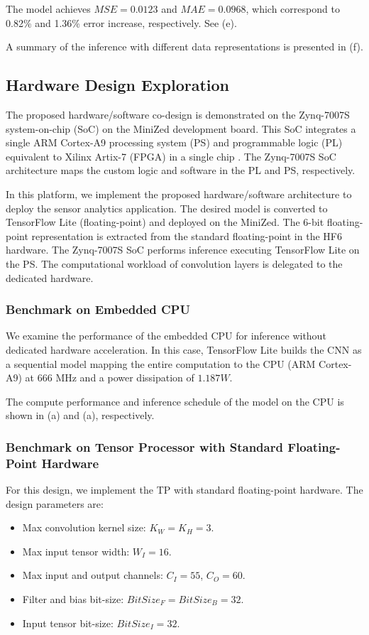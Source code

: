 The model achieves $MSE=0.0123$ and $MAE=0.0968$, which correspond to 0.82\% and 1.36\% error increase, respectively. See (e).

A summary of the inference with different data representations is presented in (f).

\subsection{Hardware Design Exploration}
The proposed hardware/software co-design is demonstrated on the Zynq-7007S system-on-chip (SoC) on the MiniZed development board. This SoC integrates a single ARM Cortex-A9 processing system (PS) and programmable logic (PL) equivalent to Xilinx Artix-7 (FPGA) in a single chip \cite{xilinx2015zynq}. The Zynq-7007S SoC architecture maps the custom logic and software in the PL and PS, respectively.

In this platform, we implement the proposed hardware/software architecture to deploy the sensor analytics application. The desired model is converted to TensorFlow Lite (floating-point) and deployed on the MiniZed. The 6-bit floating-point representation is extracted from the standard floating-point in the HF6 hardware. The Zynq-7007S SoC performs inference executing TensorFlow Lite on the PS. The computational workload of convolution layers is delegated to the dedicated hardware.

\subsubsection{Benchmark on Embedded CPU}
We examine the performance of the embedded CPU for inference without dedicated hardware acceleration. In this case, TensorFlow Lite builds the CNN as a sequential model mapping the entire computation to the CPU (ARM Cortex-A9) at 666 MHz and a power dissipation of $1.187W$.

The compute performance and inference schedule of the model on the CPU is shown in (a) and (a), respectively.

\subsubsection{Benchmark on Tensor Processor with Standard Floating-Point Hardware}
For this design, we implement the TP with standard floating-point hardware. The design parameters are:
\begin{itemize}
	\item Max convolution kernel size: $K_W = K_H = 3$.
	\item Max input tensor width: $W_I = 16$.
	\item Max input and output channels: $C_I = 55$, $C_O = 60$.
	\item Filter and bias bit-size: $BitSize_F=BitSize_B=32$.
	\item Input tensor bit-size: $BitSize_I=32$.
\end{itemize}

